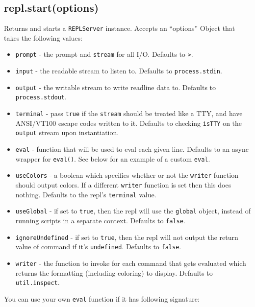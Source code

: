 \subsection{repl.start(options)}

Returns and starts a \texttt{REPLServer} instance. Accepts an
``options'' Object that takes the following values:

\begin{itemize}
\item
  \texttt{prompt} - the prompt and \texttt{stream} for all I/O. Defaults
  to \texttt{\textgreater{}}.
\item
  \texttt{input} - the readable stream to listen to. Defaults to
  \texttt{process.stdin}.
\item
  \texttt{output} - the writable stream to write readline data to.
  Defaults to \texttt{process.stdout}.
\item
  \texttt{terminal} - pass \texttt{true} if the \texttt{stream} should
  be treated like a TTY, and have ANSI/VT100 escape codes written to it.
  Defaults to checking \texttt{isTTY} on the \texttt{output} stream upon
  instantiation.
\item
  \texttt{eval} - function that will be used to eval each given line.
  Defaults to an async wrapper for \texttt{eval()}. See below for an
  example of a custom \texttt{eval}.
\item
  \texttt{useColors} - a boolean which specifies whether or not the
  \texttt{writer} function should output colors. If a different
  \texttt{writer} function is set then this does nothing. Defaults to
  the repl's \texttt{terminal} value.
\item
  \texttt{useGlobal} - if set to \texttt{true}, then the repl will use
  the \texttt{global} object, instead of running scripts in a separate
  context. Defaults to \texttt{false}.
\item
  \texttt{ignoreUndefined} - if set to \texttt{true}, then the repl will
  not output the return value of command if it's \texttt{undefined}.
  Defaults to \texttt{false}.
\item
  \texttt{writer} - the function to invoke for each command that gets
  evaluated which returns the formatting (including coloring) to
  display. Defaults to \texttt{util.inspect}.
\end{itemize}

You can use your own \texttt{eval} function if it has following
signature:

\begin{Shaded}
\begin{Highlighting}[]
 
\NormalTok{\}}
\end{Highlighting}
\end{Shaded}

